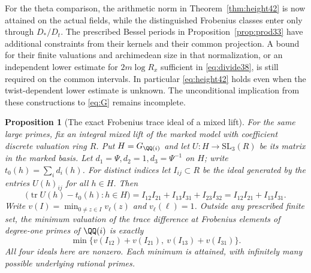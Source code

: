 \documentclass[a4paper,11pt]{article}
\newtheorem{proposition}{Proposition}[section]
\theoremstyle{definition}
\theoremstyle{remark}
\numberwithin{equation}{section}
\begin{document}
For the theta comparison, the arithmetic norm in Theorem~\ref{thm:height42} is now attained on the actual fields, while the distinguished Frobenius classes enter only through \(D_*/D_t\). The prescribed Bessel periods in Proposition~\ref{prop:prod33} have additional constraints from their kernels and their common projection. A bound for their finite valuations and archimedean size in that normalization, or an independent lower estimate for \(2m\log R_x\) sufficient in \eqref{eq:divide38}, is still required on the common intervals. In particular \eqref{eq:height42} holds even when the twist-dependent lower estimate is unknown. The unconditional implication from these constructions to \eqref{eq:G} remains incomplete.

\begin{proposition}[The exact Frobenius trace ideal of a mixed lift]\label{prop:trace45}
For the same large primes, fix an integral mixed lift of the marked model with coefficient discrete valuation ring \(R\). Put \(H=G_{\QQ(i)}\) and let \(U:H\to\mathrm{SL}_3(R)\) be its matrix in the marked basis. Let \(d_1=\Psi,d_2=1,d_3=\Psi^{-1}\) on \(H\); write \(t_0(h)=\sum_i d_i(h)\). For distinct indices let \(I_{ij}\subset R\) be the ideal generated by the entries \(U(h)_{ij}\) for all \(h\in H\). Then
\begin{equation}
 \big(\operatorname{tr}U(h)-t_0(h):h\in H\big)
       = I_{12}I_{21}+I_{13}I_{31}+I_{23}I_{32}
       = I_{12}I_{21}+I_{13}I_{31}.                         \label{eq:cycles45}
\end{equation}
Write \(v(I)=\min_{0\ne z\in I}v_\ell(z)\) and \(v_\ell(\ell)=1\). Outside any prescribed finite set, the minimum valuation of the trace difference at Frobenius elements of degree-one primes of \(\QQ(i)\) is exactly
\[
               \min\{v(I_{12})+v(I_{21}),\ v(I_{13})+v(I_{31})\}.
\]
All four ideals here are nonzero. Each minimum is attained, with infinitely many possible underlying rational primes.
\end{proposition}
\end{document}

